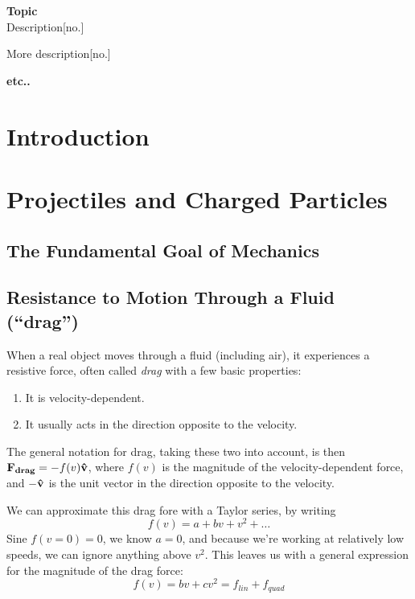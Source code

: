 \documentclass[a4paper]{article}
\begin{document}
\maketitle
{\small
    \noindent\textbf{Topic}\\
    Description\hspace*{\fill}[no.]

    \vspace{5pt}  
    \noindent More description\hspace*{\fill}[no.]
    
    \vspace{10pt}
    \noindent\textbf{etc..}
}

\tableofcontents

\setcounter{section}{-1}
\section{Introduction}

\section{Projectiles and Charged Particles}
\subsection{The Fundamental Goal of Mechanics}

\subsection{Resistance to Motion Through a Fluid (``drag'')}
When a real object moves through a fluid (including air), it experiences a
resistive force, often called \emph{drag} with a few basic properties:
\begin{enumerate}
    \item It is velocity-dependent.
    \item It usually acts in the direction opposite to the velocity.
\end{enumerate}
The general notation for drag, taking these two into account, is then
$\boldsymbol{\mathbf{F_{drag}}} = -f(v)\boldsymbol{\mathbf{\hat{v}}}$, where $f(v)$ is the magnitude of the 
velocity-dependent force,
and $-\boldsymbol{\mathbf{\hat{v}}}$ is the unit vector in the direction opposite to the
velocity.

We can approximate this drag fore with a Taylor series, by writing
\[f(v) = a+bv+v^2+\ldots\]
Sine $f(v=0)=0$, we know $a=0$, and because we're working at relatively low
speeds, we can ignore anything above $v^2$. This leaves us with a general
expression for the magnitude of the drag force:
\[
    f(v) = bv + cv^2 = f_{lin}  + f_{quad}
\]
\end{document}
